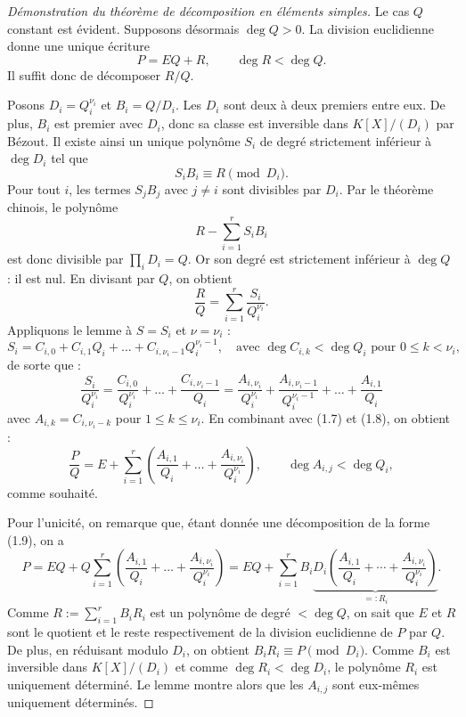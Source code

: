 \documentclass[]{report}
\begin{document}
\begin{proof}[Démonstration du théorème de décomposition en éléments simples]
    Le cas $Q$ constant est évident. Supposons désormais $\deg Q > 0$. La division euclidienne donne une unique écriture
    \[P = EQ + R, \qquad \deg R < \deg Q. \tag{1.7}\]
    Il suffit donc de décomposer $R/Q$.

    Posons $D_i = Q_i^{\nu_i}$ et $B_i = Q/D_i$. Les $D_i$ sont deux à deux premiers entre eux. De plus, $B_i$ est premier avec $D_i$, donc sa classe est inversible dans $K[X]/(D_i)$ par Bézout. Il existe ainsi un unique polynôme $S_i$ de degré strictement inférieur à $\deg D_i$ tel que
    \[S_i B_i \equiv R \pmod{D_i}.\]
    Pour tout $i$, les termes $S_j B_j$ avec $j \ne i$ sont divisibles par $D_i$. Par le théorème chinois, le polynôme
    \[R - \sum_{i=1}^{r} S_i B_i\]
    est donc divisible par $\prod_i D_i = Q$. Or son degré est strictement inférieur à $\deg Q$ : il est nul. En divisant par $Q$, on obtient
    \[\frac{R}{Q} = \sum_{i=1}^{r} \frac{S_i}{Q_i^{\nu_i}}. \tag{1.8}\]
    Appliquons le lemme à $S = S_i$ et $\nu = \nu_i$ :
    \[S_i = C_{i,0} + C_{i,1} Q_i + \dots + C_{i,\nu_i - 1} Q_i^{\nu_i - 1}, \quad \text{avec } \deg C_{i,k} < \deg Q_i \text{ pour } 0 \le k < \nu_i,\]
    de sorte que :
    \[\frac{S_i}{Q_i^{\nu_i}} = \frac{C_{i,0}}{Q_i^{\nu_i}} + \dots + \frac{C_{i,\nu_i - 1}}{Q_i} = \frac{A_{i,\nu_i}}{Q_i^{\nu_i}} + \frac{A_{i,\nu_i - 1}}{Q_i^{\nu_i - 1}} + \dots + \frac{A_{i,1}}{Q_i}\]
    avec $A_{i,k} = C_{i,\nu_i - k}$ pour $1 \le k \le \nu_i$. En combinant avec (1.7) et (1.8), on obtient :
    \[\frac{P}{Q} = E + \sum_{i = 1}^{r}\left(\frac{A_{i,1}}{Q_i} + \dots + \frac{A_{i,\nu_i}}{Q_i^{\nu_i}}\right), \qquad \deg A_{i,j} < \deg Q_i, \tag{1.9}\]
    comme souhaité.

    Pour l'unicité, on remarque que, étant donnée une décomposition de la forme (1.9), on a
    \[P = EQ + Q\sum_{i = 1}^{r}\left(\frac{A_{i,1}}{Q_i} + \dots + \frac{A_{i,\nu_i}}{Q_i^{\nu_i}}\right) = EQ + \sum_{i = 1}^{r} B_i \underbrace{D_i\left(\frac{A_{i,1}}{Q_i} + \cdots + \frac{A_{i,\nu_i}}{Q_i^{\nu_i}}\right)}_{=: R_i}.\]
    Comme $R := \sum_{i=1}^{r} B_i R_i$ est un polynôme de degré $< \deg Q$, on sait que $E$ et $R$ sont le quotient et le reste respectivement de la division euclidienne de $P$ par $Q$. De plus, en réduisant modulo $D_i$, on obtient $B_i R_i \equiv P \pmod{D_i}$. Comme $B_i$ est inversible dans $K[X]/(D_i)$ et comme $\deg R_i < \deg D_i$, le polynôme $R_i$ est uniquement déterminé. Le lemme montre alors que les $A_{i,j}$ sont eux-mêmes uniquement déterminés.
\end{proof}
\end{document}
